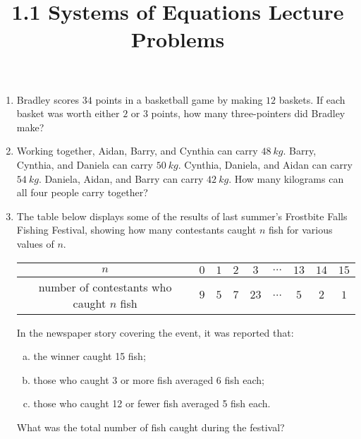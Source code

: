 \documentclass{article}
\title{1.1 Systems of Equations Lecture Problems}
\author{}
\date{}
\begin{document}
\maketitle

\begin{enumerate}
    \item Bradley scores $34$ points in a basketball game by making $12$ baskets.
        If each basket was worth either $2$ or $3$ points, how many three-pointers did Bradley make?
        \vspace{3cm}
    \item Working together, Aidan, Barry, and Cynthia can carry $\SI{48}{kg}$.
        Barry, Cynthia, and Daniela can carry $\SI{50}{kg}$.
        Cynthia, Daniela, and Aidan can carry $\SI{54}{kg}$.
        Daniela, Aidan, and Barry can carry $\SI{42}{kg}$.
        How many kilograms can all four people carry together?
        \vspace{3cm}
    \item The table below displays some of the results of last summer's Frostbite Falls Fishing Festival, showing how many contestants caught $n$ fish for various values of $n$.
        \begin{center}
            \begin{tabular}{|c|c|c|c|c|c|c|c|c|}
                \hline
                $n$ & $0$ & $1$ & $2$ & $3$ & $\dots$ & $13$ & $14$ & $15$ \\
                \hline
                number of contestants who caught $n$ fish & $9$ & $5$ & $7$ & $23$ & $\dots$ & $5$ & $2$ & $1$ \\
                \hline
            \end{tabular}
        \end{center}
        In the newspaper story covering the event, it was reported that:
        \begin{enumerate}[(a)]
            \item the winner caught 15 fish;
            \item those who caught 3 or more fish averaged 6 fish each;
            \item those who caught 12 or fewer fish averaged 5 fish each.
        \end{enumerate}
        What was the total number of fish caught during the festival?
\end{enumerate}
\end{document}
